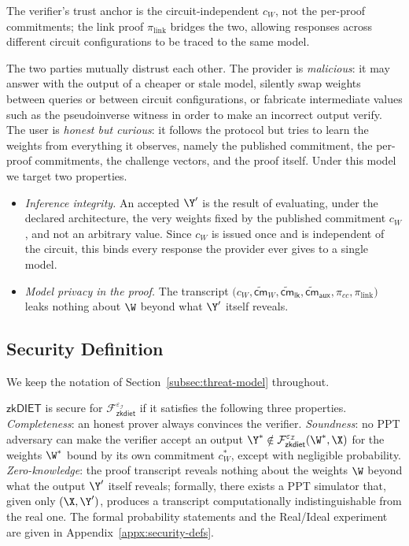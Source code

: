 The verifier's trust anchor is the circuit-independent $c_{W}$, not the per-proof commitments; the link proof $\pi_{\mathrm{link}}$ bridges the two, allowing responses across different circuit configurations to be traced to the same model.

 The two parties mutually distrust each other. The provider is \emph{malicious}: it may answer with the output of a cheaper or stale model, silently swap weights between queries or between circuit configurations, or fabricate intermediate values such as the pseudoinverse witness in order to make an incorrect output verify. The user is \emph{honest but curious}: it follows the protocol but tries to learn the weights from everything it observes, namely the published commitment, the per-proof commitments, the challenge vectors, and the proof itself. Under this model we target two properties.

\begin{itemize} [leftmargin=3mm, itemsep=2pt, topsep=2pt]
    \item \emph{Inference integrity.} An accepted $\Y'$ is the result of evaluating, under the declared architecture, the very weights fixed by the published commitment $c_{W}$, and not an arbitrary value. Since $c_{W}$ is issued once and is independent of the circuit, this binds every response the provider ever gives to a single model.
    \item \emph{Model privacy in the proof.} The transcript $\bigl(c_{W}, \widetilde{\mathsf{cm}}_{W}, \widetilde{\mathsf{cm}}_{\mathsf{lk}}, \widetilde{\mathsf{cm}}_{\mathsf{aux}}, \pi_{cc}, \pi_{\mathrm{link}}\bigr)$ leaks nothing about $\W$ beyond what $\Y'$ itself reveals.
\end{itemize}

\subsection{Security Definition}
\label{subsec:sec-def}

We keep the notation of Section~\ref{subsec:threat-model} throughout.

\begin{definition}
\label{def:zkdiet}
$\mathsf{zkDIET}$ is secure for $\mathcal{F}^{\varepsilon_\mathcal{I}}_{\mathsf{zkdiet}}$ if it satisfies the following three properties.
\emph{Completeness}: an honest prover always convinces the verifier.
\emph{Soundness}: no PPT adversary can make the verifier accept an output $\Y^{*}\notin\mathcal{F}^{\varepsilon_\mathcal{I}}_{\mathsf{zkdiet}}(\W^{*},\X)$ for the weights $\W^{*}$ bound by its own commitment $c_{W}^{*}$, except with negligible probability.
\emph{Zero-knowledge}: the proof transcript reveals nothing about the weights $\W$ beyond what the output $\Y'$ itself reveals; formally, there exists a PPT simulator that, given only $(\X,\Y')$, produces a transcript computationally indistinguishable from the real one.
The formal probability statements and the Real/Ideal experiment are given in Appendix~\ref{appx:security-defs}.
\end{definition}


